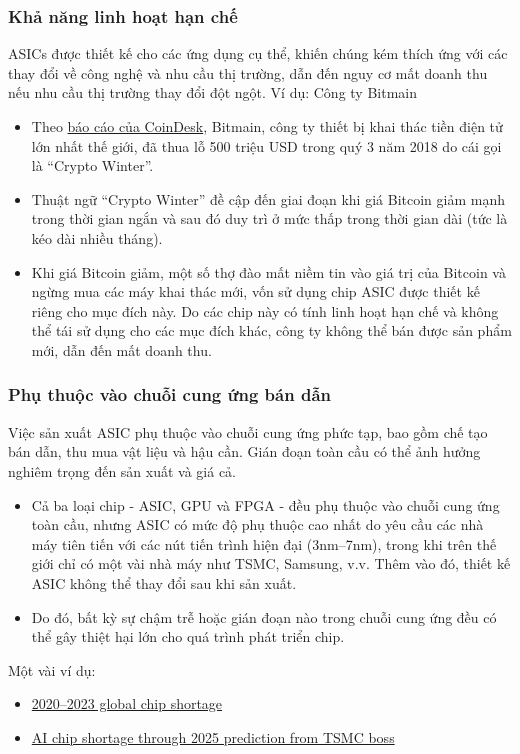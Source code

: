 \documentclass[a4paper]{article}
\begin{document}
\subsubsection{Khả năng linh hoạt hạn chế}
ASICs được thiết kế cho các ứng dụng cụ thể, khiến chúng kém thích ứng với các thay đổi về công nghệ và nhu cầu thị trường, dẫn đến nguy cơ mất doanh thu nếu nhu cầu thị trường thay đổi đột ngột.
Ví dụ: Công ty Bitmain
\begin{itemize}
    \item Theo \href{https://www.coindesk.com/markets/2018/09/27/bitmain-by-the-numbers-an-inside-look-at-a-bitcoin-mining-empire}{báo cáo của CoinDesk}, Bitmain, công ty thiết bị khai thác tiền điện tử lớn nhất thế giới, đã thua lỗ 500 triệu USD trong quý 3 năm 2018 do cái gọi là “Crypto Winter”.  
    \item Thuật ngữ “Crypto Winter” đề cập đến giai đoạn khi giá Bitcoin giảm mạnh trong thời gian ngắn và sau đó duy trì ở mức thấp trong thời gian dài (tức là kéo dài nhiều tháng).  
    \item Khi giá Bitcoin giảm, một số thợ đào mất niềm tin vào giá trị của Bitcoin và ngừng mua các máy khai thác mới, vốn sử dụng chip ASIC được thiết kế riêng cho mục đích này. Do các chip này có tính linh hoạt hạn chế và không thể tái sử dụng cho các mục đích khác, công ty không thể bán được sản phẩm mới, dẫn đến mất doanh thu.

\end{itemize}

\subsubsection{Phụ thuộc vào chuỗi cung ứng bán dẫn}
Việc sản xuất ASIC phụ thuộc vào chuỗi cung ứng phức tạp, bao gồm chế tạo bán dẫn, thu mua vật liệu và hậu cần. Gián đoạn toàn cầu có thể ảnh hưởng nghiêm trọng đến sản xuất và giá cả. 
\begin{itemize}
    \item Cả ba loại chip - ASIC, GPU và FPGA - đều phụ thuộc vào chuỗi cung ứng toàn cầu, nhưng ASIC có mức độ phụ thuộc cao nhất do yêu cầu các nhà máy tiên tiến với các nút tiến trình hiện đại (3nm–7nm), trong khi trên thế giới chỉ có một vài nhà máy như TSMC, Samsung, v.v. Thêm vào đó, thiết kế ASIC không thể thay đổi sau khi sản xuất.
    \item Do đó, bất kỳ sự chậm trễ hoặc gián đoạn nào trong chuỗi cung ứng đều có thể gây thiệt hại lớn cho quá trình phát triển chip.    
\end{itemize}
Một vài ví dụ:
\begin{itemize}
    \item \href{https://en.wikipedia.org/wiki/2020%E2%80%932023_global_chip_shortage}{2020–2023 global chip shortage}
    \item \href{https://www.theregister.com/2024/07/18/tsmc_ceo_predicts_ai_chip/}{AI chip shortage through 2025 prediction from TSMC boss}
\end{itemize}
\end{document}
